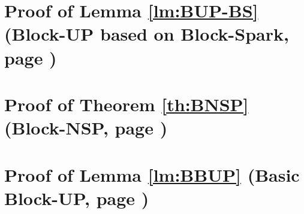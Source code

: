 \section{Proof of Lemma \ref{lm:BUP-BS} (Block-UP based on Block-Spark, page \pageref{lm:BUP-BS})} %
\label{sec:BUP-BS} 

\newpage
\section{Proof of Theorem \ref{th:BNSP} (Block-NSP, page \pageref{th:BNSP})}
\label{prf:BNSP} 

\newpage
\section{Proof of Lemma \ref{lm:BBUP} (Basic Block-UP, page \pageref{lm:BBUP})}
\label{prf:BBUP} 

\newpage
